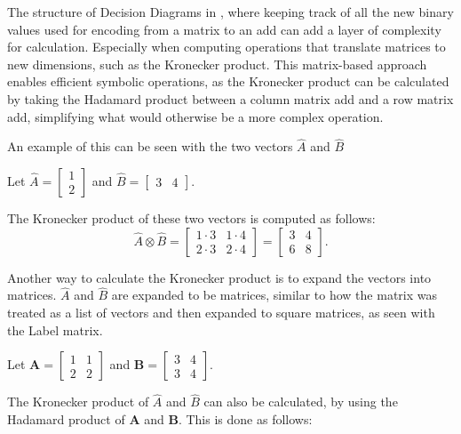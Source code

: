 The structure of Decision Diagrams in \Cupaal, where keeping track of all the new binary values used for encoding from a matrix to an \gls{add} can add a layer of complexity for calculation.
Especially when computing operations that translate matrices to new dimensions, such as the Kronecker product.
This matrix-based approach enables efficient symbolic operations, as the Kronecker product can be calculated by taking the Hadamard product between a column matrix \gls{add} and a row matrix \gls{add}, simplifying what would otherwise be a more complex operation.

An example of this can be seen with the two vectors $\hat{A}$ and $\hat{B}$

Let $\hat{A} = \begin{bmatrix}
        1 \\
        2
    \end{bmatrix}$
and $\hat{B}=\begin{bmatrix}
        3 & 4
    \end{bmatrix}$.

The Kronecker product of these two vectors is computed as follows:
\begin{equation}
    \hat{A} \otimes \hat{B} = \begin{bmatrix}
        1 \cdot 3 & 1 \cdot 4 \\
        2 \cdot 3 & 2 \cdot 4
    \end{bmatrix} = \begin{bmatrix}
        3 & 4 \\
        6 & 8
    \end{bmatrix}.
    \label{eq:kronecker-product-example}
\end{equation}

Another way to calculate the Kronecker product is to expand the vectors into matrices.
$\hat{A}$ and $\hat{B}$ are expanded to be matrices, similar to how the matrix was treated as a list of vectors and then expanded to square matrices, as seen with the Label matrix.

Let $\mathbf{A} = \begin{bmatrix}
        1 & 1 \\
        2 & 2
    \end{bmatrix}$ and
$\mathbf{B} = \begin{bmatrix}
        3 & 4 \\
        3 & 4
    \end{bmatrix}$.

The Kronecker product of $\hat{A}$ and $\hat{B}$ can also be calculated, by using the Hadamard product of $\mathbf{A}$ and $\mathbf{B}$.
This is done as follows:


